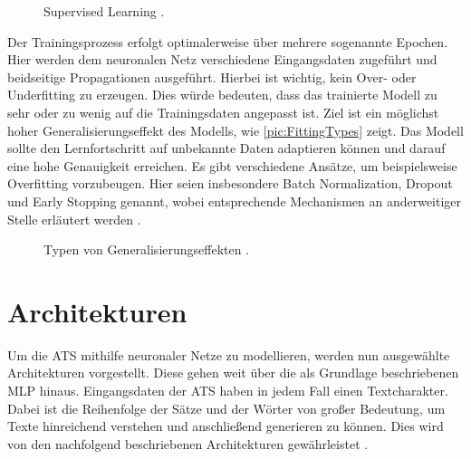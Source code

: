 \begin{figure}[h!]
  \centering
  \caption{Supervised Learning \cite[S.~3]{RAS19}.}
  \label{pic:SupervisedLearning}
\end{figure}

\noindent
Der Trainingsprozess erfolgt optimalerweise über mehrere sogenannte Epochen. Hier werden dem neuronalen Netz verschiedene Eingangsdaten zugeführt und beidseitige Propagationen ausgeführt. Hierbei ist wichtig, kein Over- oder Underfitting zu erzeugen. Dies würde bedeuten, dass das trainierte Modell zu sehr oder zu wenig auf die Trainingsdaten angepasst ist. Ziel ist ein möglichst hoher Generalisierungseffekt des Modells, wie \autoref{pic:FittingTypes} zeigt. Das Modell sollte den Lernfortschritt auf unbekannte Daten adaptieren können und darauf eine hohe Genauigkeit erreichen. Es gibt verschiedene Ansätze, um beispielsweise Overfitting vorzubeugen. Hier seien insbesondere Batch Normalization, Dropout und Early Stopping genannt, wobei entsprechende Mechanismen an anderweitiger Stelle erläutert werden \cite[S.~143-149]{ZHA20}.\\

\begin{figure}[h!]
  \centering
  \caption{Typen von Generalisierungseffekten \cite{EDPOJ}.}
  \label{pic:FittingTypes}
\end{figure}


\section{Architekturen}
\noindent
Um die \ac{ATS} mithilfe neuronaler Netze zu modellieren, werden nun ausgewählte Architekturen vorgestellt. Diese gehen weit über die als Grundlage beschriebenen \ac{MLP} hinaus. Eingangsdaten der \ac{ATS} haben in jedem Fall einen Textcharakter. Dabei ist die Reihenfolge der Sätze und der Wörter von großer Bedeutung, um Texte hinreichend verstehen und anschließend generieren zu können. Dies wird von den nachfolgend beschriebenen Architekturen gewährleistet \cite[S.~301]{ZHA20}.


